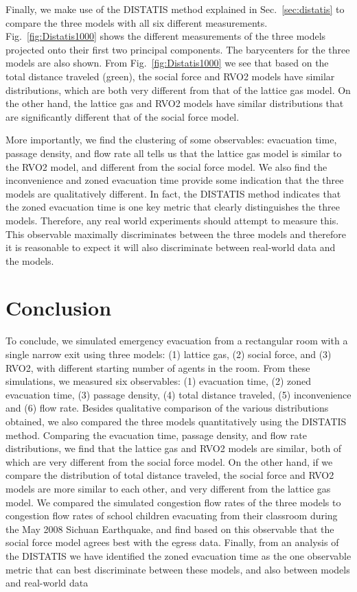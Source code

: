 Finally, we make use of the DISTATIS method explained in Sec.~\ref{sec:distatis} to compare the three models with all six different measurements. Fig.~\ref{fig:Distatis1000} shows the different measurements of the three models projected onto their first two principal components. The barycenters for the three models are also shown. From Fig.~\ref{fig:Distatis1000} we see that based on the total distance traveled (green), the social force and RVO2 models have similar distributions, which are both very different from that of the lattice gas model. On the other hand, the lattice gas and RVO2 models have similar distributions that are significantly different that of the social force model.

More importantly, we find the clustering of some observables: evacuation time, passage density, and flow rate all tells us that the lattice gas model is similar to the RVO2 model, and different from the social force model. We also find the inconvenience and zoned evacuation time provide some indication that the three models are qualitatively different. In fact, the DISTATIS method indicates that the zoned evacuation time is one key metric that clearly distinguishes the three models. Therefore, any real world experiments should attempt to measure this. This observable maximally discriminates between the three models and therefore it is reasonable to expect it will also discriminate between real-world data and the models.

\section{Conclusion}\label{Conclusions}

To conclude, we simulated emergency evacuation from a rectangular room with a single narrow exit using three models: (1) lattice gas, (2) social force, and (3) RVO2, with different starting number of agents in the room. From these simulations, we measured six observables: (1) evacuation time, (2) zoned evacuation time, (3) passage density, (4) total distance traveled, (5) inconvenience and (6) flow rate. Besides qualitative comparison of the various distributions obtained, we also compared the three models quantitatively using the DISTATIS method. Comparing the evacuation time, passage density, and flow rate distributions, we find that the lattice gas and RVO2 models are similar, both of which are very different from the social force model. On the other hand, if we compare the distribution of total distance traveled, the social force and RVO2 models are more similar to each other, and very different from the lattice gas model. We compared the simulated congestion flow rates of the three models to congestion flow rates of school children evacuating from their classroom during the May 2008 Sichuan Earthquake, and find based on this observable that the social force model agrees best with the egress data. Finally, from an analysis of the DISTATIS we have identified the zoned evacuation time as the one observable metric that can best discriminate between these models, and also between models and real-world data

